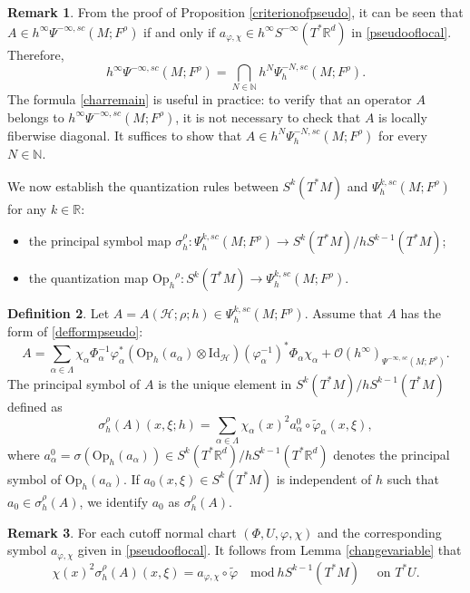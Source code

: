 \documentclass[11pt,oneside,reqno]{amsart}
\newcommand\N{\ensuremath{\mathbb{N}}}
\newcommand\R{\ensuremath{\mathbb{R}}}
\newcommand\Oph{\ensuremath{\mathrm{Op}_h}}
\theoremstyle{definition}
\newtheorem{definition}{Definition}[section]
\newtheorem{remark}[definition]{Remark}
\numberwithin{equation}{section}
\theoremstyle{plain}
\begin{document}
\begin{remark}
    From the proof of Proposition \ref{criterionofpseudo}, it can be seen that $A \in h^{\infty} \Psi^{-\infty,sc}(M;F^\rho)$ if and only if $a_{\varphi,\chi} \in h^\infty S^{-\infty}(T^*\R^d)$ in \eqref{pseudooflocal}. Therefore,
    \begin{equation}\label{charremain}
        h^{\infty} \Psi^{-\infty,sc}(M;F^\rho) = \bigcap_{N\in \N} h^N \Psi_h^{-N,sc}(M;F^\rho).
    \end{equation}
The formula \eqref{charremain} is useful in practice: to verify that an operator $A$ belongs to $h^{\infty} \Psi^{-\infty,sc}(M;F^\rho)$, it is not necessary to check that $A$ is locally fiberwise diagonal. It suffices to show that $A \in h^N \Psi_h^{-N,sc}(M;F^\rho)$ for every $N\in \N$.
\end{remark}


We now establish the quantization rules between $S^k(T^*M)$ and $\Psi^{k,sc}_h(M;F^\rho)$ for any $k \in \mathbb{R}$:
\begin{itemize}
\item the principal symbol map $\sigma^\rho_h:\Psi^{k,sc}_h(M;F^\rho) \rightarrow S^k(T^*M) /hS^{k-1}(T^*M)  $;
\item the quantization map $\Oph^\rho:S^k(T^*M) \rightarrow \Psi^{k,sc}_h(M;F^\rho)$.
\end{itemize}


\begin{definition}\label{defofprincipalsymbol}
Let $A=A(\mathcal{H};\rho;h) \in \Psi_h^{k,sc}(M;F^\rho)$. Assume that $A$ has the form of \eqref{defformpseudo}:
\begin{equation*}
    A=\sum_{\alpha\in \Lambda} \chi_{\alpha }\Phi_{\alpha}^{-1} \varphi_{\alpha}^*( \Oph(a_{\alpha})\otimes \mathrm{Id}_{\mathcal{H}})(\varphi_{\alpha}^{-1})^* \Phi_{\alpha}\chi_{\alpha}  +  \mathcal{O}(h^{\infty})_{\Psi^{-\infty,sc}(M;F^\rho)}.
\end{equation*}
The principal symbol of $A$ is the unique element in $S^k (T^* M)/h S^{k-1}(T^* M)$ defined as 
\begin{equation}
    \sigma_h^{\rho}(A)(x,\xi;h)=\sum_{\alpha \in \Lambda} \chi_{\alpha}(x)^2 a_{\alpha}^0\circ \widetilde{\varphi}_{\alpha}(x,\xi),
\end{equation}
where $a_{\alpha}^{0}=\sigma(\Oph(a_\alpha)) \in S^{k}(T^*\mathbb{R}^d)/h S^{k-1}(T^*\mathbb{R}^d)$ denotes the principal symbol of $\Oph(a_\alpha)$. If $a_0(x,\xi) \in S^{k} (T^*M)$ is independent of $h$ such that $a_{0} \in \sigma_{h}^{\rho}(A)  $, we identify $a_{0} $ as $\sigma_h^{\rho}(A)$.
\end{definition}
\begin{remark}
    For each cutoff normal chart $(\Phi, U,\varphi, \chi)$ and the corresponding symbol  $a_{\varphi, \chi}$ given in \eqref{pseudooflocal}. It follows from Lemma \ref{changevariable} that
\begin{equation*}
    \chi(x)^2 \sigma_h^{\rho}(A)(x,\xi)=a_{\varphi, \chi}\circ \widetilde{\varphi} \quad \mathrm{mod} \ hS^{k-1} (T^*M) \quad \text { on } T^* U.
\end{equation*}
\end{remark}
\end{document}
